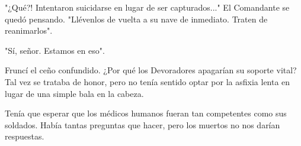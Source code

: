 \documentclass[spanish,12pt,a4paper,oneside,titlepage]{book}
\begin{document}
    "¿Qué?! Intentaron suicidarse en lugar de ser capturados..." El Comandante se quedó pensando. "Llévenlos de vuelta a su nave de inmediato. Traten de reanimarlos".

    "Sí, señor. Estamos en eso".

    Fruncí el ceño confundido. ¿Por qué los Devoradores apagarían su soporte vital? Tal vez se trataba de honor, pero no tenía sentido optar por la asfixia lenta en lugar de una simple bala en la cabeza.

    Tenía que esperar que los médicos humanos fueran tan competentes como sus soldados. Había tantas preguntas que hacer, pero los muertos no nos darían respuestas.
\end{document}

